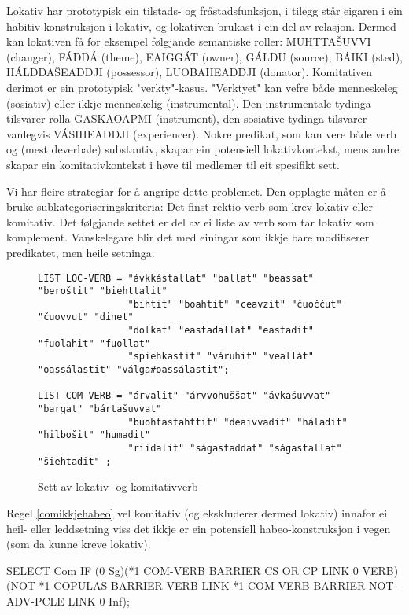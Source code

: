 \documentclass[a4paper,norsk]{article}
\begin{document}
Lokativ har prototypisk ein tilstads- og fråstadsfunksjon, i tilegg står eigaren i ein habitiv-konstruksjon i lokativ, og lokativen brukast i ein del-av-relasjon. Dermed kan lokativen få for eksempel følgjande semantiske roller: MUHTTAŠUVVI (changer), FÁDDÁ (theme), EAIGGÁT (owner), GÁLDU (source), BÁIKI (sted), HÁLDDAŠEADDJI (possessor), LUOBAHEADDJI (donator). Komitativen derimot er ein prototypisk "verkty"-kasus. "Verktyet" kan vefre både menneskeleg (sosiativ) eller ikkje-menneskelig (instrumental). Den instrumentale tydinga tilsvarer rolla GASKAOAPMI (instrument), den sosiative tydinga tilsvarer vanlegvis VÁSIHEADDJI (experiencer).
Nokre predikat, som kan vere både verb og (mest deverbale) substantiv, skapar ein potensiell lokativkontekst, mens andre skapar ein komitativkontekst i høve til medlemer til eit spesifikt sett.

Vi har fleire strategiar for å angripe dette problemet. Den opplagte måten er å bruke subkategoriseringskriteria: Det finst rektio-verb som krev lokativ eller komitativ. Det følgjande settet er del av ei liste av verb som tar lokativ som komplement. Vanskelegare blir det med einingar som ikkje bare modifiserer predikatet, men heile setninga. %

\begin{figure}[htbp]
\begin{center}
\begin{verbatim}
LIST LOC-VERB = "ávkkástallat" "ballat" "beassat" "beroštit" "biehttalit"
			 	"bihtit" "boahtit" "ceavzit" "čuoččut" "čuovvut" "dinet" 
			 	"dolkat" "eastadallat" "eastadit" "fuolahit" "fuollat" 
			 	"spiehkastit" "váruhit" "veallát" "oassálastit" "válga#oassálastit";
			 	
LIST COM-VERB = "árvalit" "árvvohuššat" "ávkašuvvat" "bargat" "bártašuvvat"
 				"buohtastahttit" "deaivvadit" "háladit" "hilbošit" "humadit"
 				"riidalit" "ságastaddat" "ságastallat" "šiehtadit" ;
\end{verbatim}
\caption{Sett av lokativ- og komitativverb}
\label{loccomverb}
\end{center}
\end{figure}

Regel \ref{comikkjehabeo} vel komitativ (og ekskluderer dermed lokativ) innafor ei heil- eller leddsetning viss det ikkje er ein potensiell habeo-konstruksjon i vegen (som da kunne kreve lokativ). %

\begin{example}\label{comikkjehabeo}
SELECT Com IF (0 Sg)(*1 COM-VERB BARRIER CS OR CP LINK 0 VERB)
	(NOT *1 COPULAS BARRIER VERB LINK *1 COM-VERB BARRIER NOT-ADV-PCLE 
	LINK 0 Inf);    
\end{example}
\end{document}
